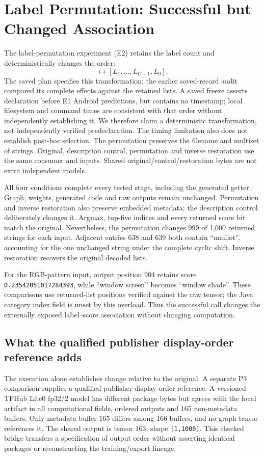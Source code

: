 \documentclass[10pt,conference]{IEEEtran}
\newcommand{\code}[1]{\texttt{#1}}
\begin{document}
\section{Label Permutation: Successful but Changed Association}
\label{sec:e2}
The label-permutation experiment (E2) retains the label count and deterministically changes the order:
\begin{equation}
[L_0,L_1,\ldots,L_{C-1}]
\mapsto[L_1,\ldots,L_{C-1},L_0].
\end{equation}
The saved plan specifies this transformation; the earlier saved-record audit compared its complete effects against the retained lists. A saved freeze asserts declaration before E1 Android predictions, but contains no timestamp; local filesystem and command times are consistent with that order without independently establishing it. We therefore claim a deterministic transformation, not independently verified predeclaration. The timing limitation also does not establish post-hoc selection. The permutation preserves the filename and multiset of strings. Original, description control, permutation and inverse restoration use the same consumer and inputs. Shared original/control/restoration bytes are not extra independent models.

All four conditions complete every tested stage, including the generated getter. Graph, weights, generated code and raw outputs remain unchanged. Permutation and inverse restoration also preserve embedded metadata; the description control deliberately changes it. Argmax, top-five indices and every returned score bit match the original. Nevertheless, the permutation changes 999 of 1,000 returned strings for each input. Adjacent entries 638 and 639 both contain ``maillot'', accounting for the one unchanged string under the complete cyclic shift. Inverse restoration recovers the original decoded lists.

For the RGB-pattern input, output position 904 retains score \code{0.23542051017284393}, while ``window screen'' becomes ``window shade''. These comparisons use returned-list positions verified against the raw tensor; the Java category index field is unset by this overload. Thus the successful call changes the externally exposed label--score association without changing computation.

\subsection{What the qualified publisher display-order reference adds}
\label{sec:p3}
The execution alone establishes change relative to the original. A separate P3 comparison supplies a qualified publisher display-order reference. A versioned TFHub Lite0 fp32/2 model has different package bytes but agrees with the focal artifact in all computational fields, ordered outputs and 165 non-metadata buffers. Only metadata buffer 165 differs among 166 buffers, and no graph tensor references it. The shared output is tensor 163, shape \code{[1,1000]}. This checked bridge transfers a specification of output order without asserting identical packages or reconstructing the training/export lineage.
\end{document}
